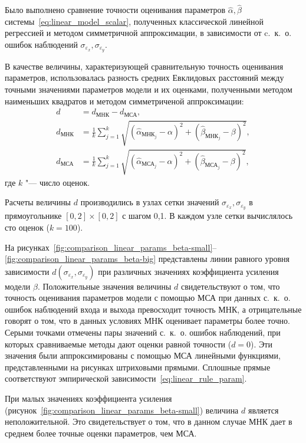 Было выполнено сравнение точности оценивания параметров
\( \hat{\alpha}, \hat{\beta} \) системы~\eqref{eq:linear_model_scalar},
полученных классической линейной регрессией и методом симметричной аппроксимации,
в зависимости от c.~к.~о. ошибок наблюдений \( \sigma_{\varepsilon_x}, \sigma_{\varepsilon_y} \).

В качестве величины, характеризующей сравнительную точность оценивания параметров,
использовалась разность средних Евклидовых расстояний
между точными значениями параметров модели и их оценками,
полученными методом наименьших квадратов и методом симметриченой аппроксимации:
\begin{equation*}
  \begin{aligned}
    d &= d_{\text{МНК}} - d_{\text{МСА}}, \\
    d_{\text{МНК}} &= \frac{1}{k} \sum_{j=1}^k \sqrt{(\hat{\alpha}_{\text{МНК}_j} - \alpha)^2 + (\hat{\beta}_{\text{МНК}_j} - \beta)^2}, \\
    d_{\text{МСА}} &= \frac{1}{k} \sum_{j=1}^k \sqrt{(\hat{\alpha}_{\text{МСА}_j} - \alpha)^2 + (\hat{\beta}_{\text{МСА}_j} - \beta)^2},
  \end{aligned}
\end{equation*}
где \( k \) "--- число оценок.

Расчеты величины \( d \) производились в узлах сетки значений
\( \sigma_{\varepsilon_x}, \sigma_{\varepsilon_y} \) в прямоугольнике
\( [0, 2] \times [0, 2] \) с шагом 0{,}1.
В каждом узле сетки вычислялось сто оценок (\( k = 100 \)).

На рисунках~\ref{fig:comparison_linear_params_beta-small}--\ref{fig:comparison_linear_params_beta-big}
представлены линии равного уровня зависимости \( d(\sigma_{\varepsilon_x}, \sigma_{\varepsilon_y}) \)
при различных значениях коэффициента усиления модели \( \beta \).
Положительные значения величины \( d \) свидетельствуют о том,
что точность оценивания параметров модели с помощью МСА при данных с.~к.~о.
ошибок наблюдений входа и выхода превосходит точность МНК,
а отрицательные говорят о том, что в данных условиях МНК оценивает параметры более точно.
Серыми точками отмечены пары значений с.~к.~о. ошибок наблюдений,
при которых сравниваемые методы дают оценки равной точности (\( d = 0 \)).
Эти значения были аппроксимированы с помощью МСА линейными функциями,
представленными на рисунках штриховыми прямыми.
Сплошные прямые соответствуют эмпирической зависимости~\eqref{eq:linear_rule_param}.

При малых значениях коэффициента усиления
(рисунок~\ref{fig:comparison_linear_params_beta-small})
величина \( d \) является неположительной.
Это свидетельствует о том, что в данном случае МНК дает в
среднем более точные оценки параметров, чем МСА.

